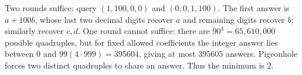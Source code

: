 Two rounds suffice: query $(1,100,0,0)$ and $(0,0,1,100)$. The first answer is $a+100b$, whose last two decimal digits recover $a$ and remaining digits recover $b$; similarly recover $c,d$. One round cannot suffice: there are $90^4=65,610,000$ possible quadruples, but for fixed allowed coefficients the integer answer lies between $0$ and $99(4\cdot 999)=395604$, giving at most $395605$ answers. Pigeonhole forces two distinct quadruples to share an answer. Thus the minimum is $\boxed 2$.
